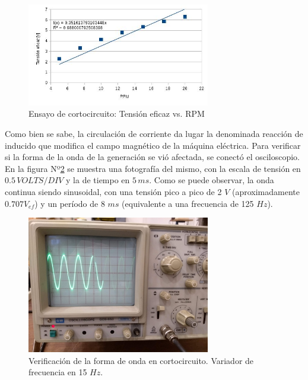 \documentclass[a4paper,11pt,twoside]{IT-CNEA}
\begin{document}
\begin{figure}[h!]
\centering
\includegraphics[width=8cm]{Figuras/TensionCortocircuito.jpg}
\caption{Ensayo de cortocircuito: Tensión eficaz vs. RPM}
\label{fig:TensionCortocircuito}
\end{figure}
\par Como bien se sabe, la circulación de corriente da lugar la denominada reacción de inducido que modifica el campo magnético de la máquina eléctrica. Para verificar si la forma de la onda de la generación se vió afectada, se conectó el osciloscopio. En la figura Nº\ref{fig:OsciloscopioCortocircuito} se muestra una fotografía del mismo, con la escala de tensión en $0.5\,VOLTS/DIV$ y la de tiempo en $5\,ms$. Como se puede observar, la onda continua siendo sinusoidal, con una tensión pico a pico de 2 $V$ (aproximadamente $0.707V_{ef}$) y un período de 8 $ms$ (equivalente a una frecuencia de 125 $Hz$).
\begin{figure}[h!]
\centering
\includegraphics[width=8cm]{Figuras/OsciloscopioCortocircuito.jpg}
\caption{Verificación de la forma de onda en cortocircuito. Variador de frecuencia en 15 $Hz.$}
\label{fig:OsciloscopioCortocircuito}
\end{figure}
\end{document}
